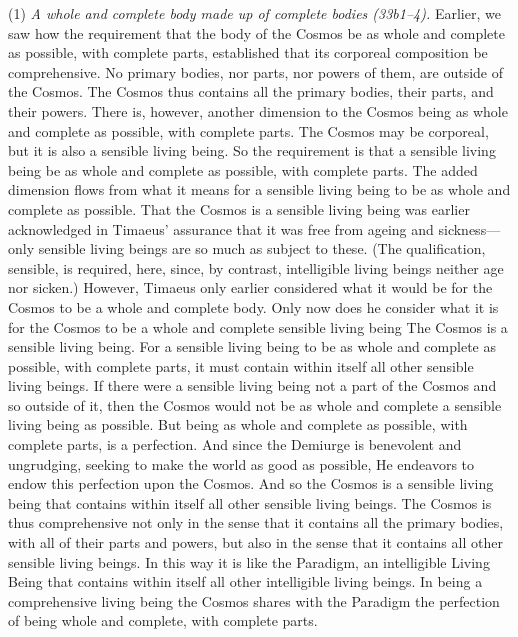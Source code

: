 (1) \emph{A whole and complete body made up of complete bodies (33b1--4).} Earlier, we saw how the requirement that the body of the Cosmos be as whole and complete as possible, with complete parts, established that its corporeal composition be comprehensive. No primary bodies, nor parts, nor powers of them, are outside of the Cosmos. The Cosmos thus contains all the primary bodies, their parts, and their powers. There is, however, another dimension to the Cosmos being as whole and complete as possible, with complete parts. The Cosmos may be corporeal, but it is also a sensible living being. So the requirement is that a sensible living being be as whole and complete as possible, with complete parts. The added dimension flows from what it means for a sensible living being to be as whole and complete as possible. That the Cosmos is a sensible living being was earlier acknowledged in Timaeus' assurance that it was free from ageing and sickness---only sensible living beings are so much as subject to these. (The qualification, sensible, is required, here, since, by contrast, intelligible living beings neither age nor sicken.) However, Timaeus only earlier considered what it would be for the Cosmos to be a whole and complete body. Only now does he consider what it is for the Cosmos to be a whole and complete sensible living being
The Cosmos is a sensible living being. For a sensible living being to be as whole and complete as possible, with complete parts, it must contain within itself all other sensible living beings. If there were a sensible living being not a part of the Cosmos and so outside of it, then the Cosmos would not be as whole and complete a sensible living being as possible. But being as whole and complete as possible, with complete parts, is a perfection. And since the Demiurge is benevolent and ungrudging, seeking to make the world as good as possible, He endeavors to endow this perfection upon the Cosmos. And so the Cosmos is a sensible living being that contains within itself all other sensible living beings. The Cosmos is thus comprehensive not only in the sense that it contains all the primary bodies, with all of their parts and powers, but also in the sense that it contains all other sensible living beings. In this way it is like the Paradigm, an intelligible Living Being that contains within itself all other intelligible living beings. In being a comprehensive living being the Cosmos shares with the Paradigm the perfection of being whole and complete, with complete parts.


